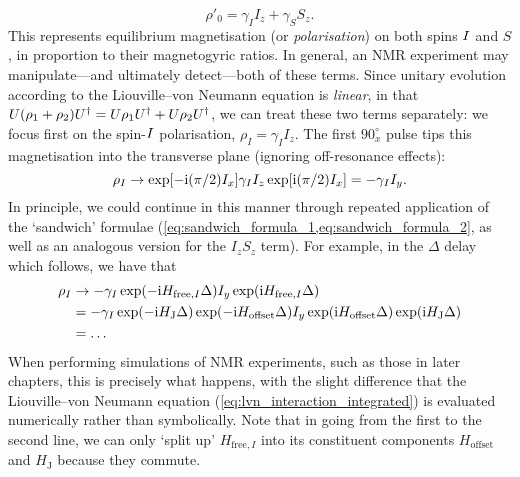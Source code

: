 \begin{equation}
    \label{eq:density_eqm_heteronuclear_simplified}
    \rho'_0 = \gamma_I I_z + \gamma_S S_z.
\end{equation}
This represents equilibrium magnetisation (or \textit{polarisation}) on both spins $I\/$ and $S$, in proportion to their magnetogyric ratios.
In general, an NMR experiment may manipulate---and ultimately detect---both of these terms.
Since unitary evolution according to the Liouville--von Neumann equation is \textit{linear}, in that $U(\rho_1 + \rho_2)U^\dagger = U\rho_1U^\dagger + U\rho_2U^\dagger$, we can treat these two terms separately: we focus first on the spin-$I\/$ polarisation, $\rho_I = \gamma_I I_z$.
The first $90^\circ_x$ \proton{} pulse tips this magnetisation into the transverse plane (ignoring off-resonance effects):
\begin{equation}
    \label{eq:rho_after_pulse_x}
    \rho_I \to \exp[-\mathrm{i}(\pi/2) I_x] \gamma_I I_z \exp[\mathrm{i}(\pi/2) I_x] = -\gamma_I I_y.
\end{equation}
In principle, we could continue in this manner through repeated application of the `sandwich' formulae (\cref{eq:sandwich_formula_1,eq:sandwich_formula_2}, as well as an analogous version for the $I_zS_z$ term). 
For example, in the $\Delta$ delay which follows, we have that
\begin{equation}
    \label{eq:rho_after_delay_x}
    \begin{aligned}
        \rho_I &\to -\gamma_I\exp(-\mathrm{i} H_{\text{free},I} \Delta) I_y \exp(\mathrm{i} H_{\text{free},I} \Delta) \\
               &= -\gamma_I\exp(-\mathrm{i} H_\text{J} \Delta)\exp(-\mathrm{i} H_\text{offset}\Delta) I_y \exp(\mathrm{i} H_\text{offset} \Delta)\exp(\mathrm{i} H_\text{J}\Delta) \\
               &= \ldots
    \end{aligned}
\end{equation}
When performing simulations of NMR experiments, such as those in later chapters, this is precisely what happens, with the slight difference that the Liouville--von Neumann equation (\cref{eq:lvn_interaction_integrated}) is evaluated numerically rather than symbolically.
Note that in going from the first to the second line, we can only `split up' $H_{\text{free},I}$ into its constituent components $H_\text{offset}$ and $H_\text{J}$ because they commute.

